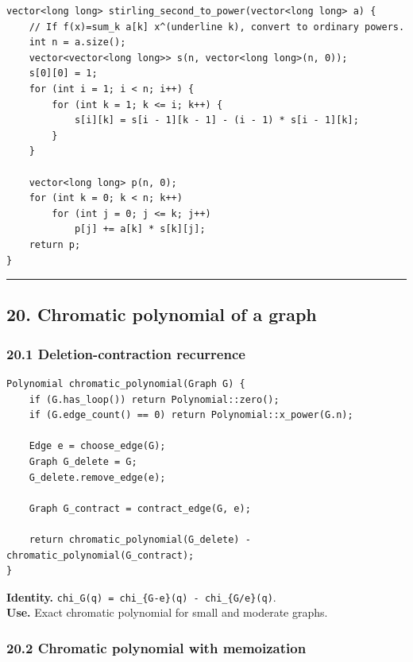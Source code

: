 \documentclass[11pt]{article}
\begin{document}
\begin{verbatim}
vector<long long> stirling_second_to_power(vector<long long> a) {
    // If f(x)=sum_k a[k] x^(underline k), convert to ordinary powers.
    int n = a.size();
    vector<vector<long long>> s(n, vector<long long>(n, 0));
    s[0][0] = 1;
    for (int i = 1; i < n; i++) {
        for (int k = 1; k <= i; k++) {
            s[i][k] = s[i - 1][k - 1] - (i - 1) * s[i - 1][k];
        }
    }

    vector<long long> p(n, 0);
    for (int k = 0; k < n; k++)
        for (int j = 0; j <= k; j++)
            p[j] += a[k] * s[k][j];
    return p;
}
\end{verbatim}

\begin{center}\rule{0.5\linewidth}{0.5pt}\end{center}

\subsection{20. Chromatic polynomial of a graph}\label{chromatic-polynomial-of-a-graph}

\subsubsection{20.1 Deletion-contraction recurrence}\label{deletion-contraction-recurrence}

\begin{verbatim}
Polynomial chromatic_polynomial(Graph G) {
    if (G.has_loop()) return Polynomial::zero();
    if (G.edge_count() == 0) return Polynomial::x_power(G.n);

    Edge e = choose_edge(G);
    Graph G_delete = G;
    G_delete.remove_edge(e);

    Graph G_contract = contract_edge(G, e);

    return chromatic_polynomial(G_delete) - chromatic_polynomial(G_contract);
}
\end{verbatim}

\textbf{Identity.} \texttt{chi\_G(q) = chi\_\{G-e\}(q) - chi\_\{G/e\}(q)}.\\
\textbf{Use.} Exact chromatic polynomial for small and moderate graphs.

\subsubsection{20.2 Chromatic polynomial with memoization}\label{chromatic-polynomial-with-memoization}
\end{document}

